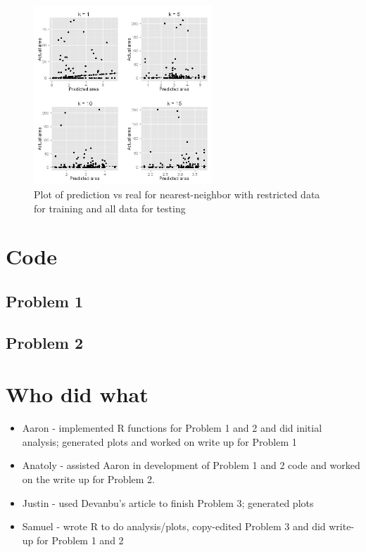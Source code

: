\documentclass{article}
\begin{document}
\begin{figure}
  \centering
  \includegraphics[width=0.6\textwidth]{knn_good_all.jpg}
  \caption{Plot of prediction vs real for nearest-neighbor with restricted data
    for training and all data for testing}
  \label{fig:knn_all}
\end{figure}

\newpage

\section{Code}
\subsection{Problem 1}

\subsection{Problem 2}


\section{Who did what}
\begin{itemize}
	\item Aaron - implemented R functions for Problem 1 and 2 and did initial analysis; generated plots and worked on write up for Problem 1
	\item Anatoly - assisted Aaron in development of Problem 1 and 2 code and worked on the write up for Problem 2.
	\item Justin - used Devanbu's article to finish Problem 3; generated plots
	\item Samuel - wrote R to do analysis/plots, copy-edited Problem 3 and did write-up for Problem 1 and 2
\end{itemize}
\end{document}
